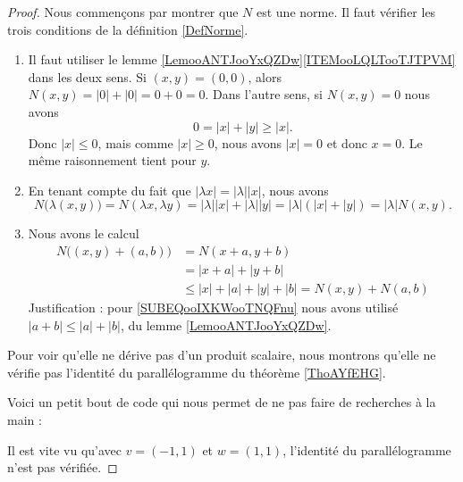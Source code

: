 \begin{proof}
	Nous commençons par montrer que \( N\) est une norme. Il faut vérifier les trois conditions de la définition \ref{DefNorme}.
	\begin{enumerate}
		\item
		      Il faut utiliser le lemme \ref{LemooANTJooYxQZDw}\ref{ITEMooLQLTooTJTPVM} dans les deux sens. Si \( (x,y)=(0,0)\), alors \( N(x,y)=| 0 |+| 0 |=0+0=0\). Dans l'autre sens, si \( N(x,y)=0\) nous avons
		      \begin{equation}
			      0=| x |+| y |\geq | x |.
		      \end{equation}
		      Donc \( | x |\leq 0\), mais comme \( | x |\geq 0\), nous avons \( | x |=0\) et donc \( x=0\). Le même raisonnement tient pour \( y\).
		\item
		      En tenant compte du fait que \( | \lambda x |=| \lambda | |x |\), nous avons
		      \begin{equation}
			      N\big( \lambda(x,y) \big)=N(\lambda x,\lambda y)=| \lambda | |x |+| \lambda | |y |=| \lambda |(| x |+| y |)=| \lambda |N(x,y).
		      \end{equation}
		\item
		      Nous avons le calcul
		      \begin{subequations}
			      \begin{align}
				      N\big( (x,y)+(a,b) \big) & =N(x+a,y+b)                                                                 \\
				                               & =| x+a |+| y+b |                                                            \\
				                               & \leq | x |+| a |+| y |+| b |     \label{SUBEQooIXKWooTNQFnu} =N(x,y)+N(a,b)
			      \end{align}
		      \end{subequations}
		      Justification : pour \eqref{SUBEQooIXKWooTNQFnu} nous avons utilisé \( | a+b |\leq | a |+| b |\), du lemme \ref{LemooANTJooYxQZDw}.
	\end{enumerate}
	Pour voir qu'elle ne dérive pas d'un produit scalaire, nous montrons qu'elle ne vérifie pas l'identité du parallélogramme du théorème \ref{ThoAYfEHG}.

	Voici un petit bout de code qui nous permet de ne pas faire de recherches à la main :
	

	Il est vite vu qu'avec \( v=(-1,1)\) et \( w=(1,1)\), l'identité du parallélogramme n'est pas vérifiée.
\end{proof}

